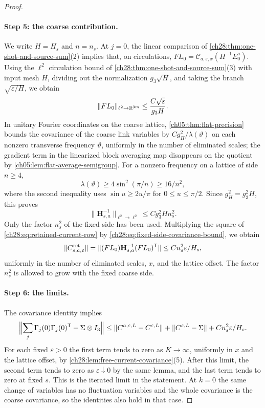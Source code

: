 \begin{proof}
\paragraph{Step 5: the coarse contribution.}
We write $H=H_s$ and $n=n_s$. At $j=0$, the linear comparison of \cref{ch28:thm:one-shot-and-source-sum}(2) implies that, on circulations, $FL_0=\mathscr C_{a,\varepsilon,x}(H^{-1}E_0^a)$. Using the $\ell^2$ circulation bound of \cref{ch28:thm:one-shot-and-source-sum}(3) with input mesh $H$, dividing out the normalization $g_3\sqrt H$, and taking the branch $\sqrt{\varepsilon/H}$, we obtain
\begin{equation}\label{ch28:eq:retained-current-row}
 \|FL_0\|_{\ell^2\to\mathbb R^{3m}}\le\frac{C\sqrt\varepsilon}{g_3H}.
\end{equation}
In unitary Fourier coordinates on the coarse lattice, \cref{ch05:thm:flat-precision} bounds the covariance of the coarse link variables by $Cg_H^2/\lambda(\vartheta)$ on each nonzero transverse frequency $\vartheta$, uniformly in the number of eliminated scales; the gradient term in the linearized block averaging map disappears on the quotient by \cref{ch05:lem:flat-average-semigroup}. For a nonzero frequency on a lattice of side $n\ge4$,
\[
 \lambda(\vartheta)\ge4\sin^2(\pi/n)\ge16/n^2,
\]
where the second inequality uses $\sin u\ge2u/\pi$ for $0\le u\le\pi/2$. Since $g_H^2=g_3^2H$, this proves
\begin{equation}\label{ch28:eq:fixed-side-covariance-bound}
 \|\mathbf H_{s,a}^{-1}\|_{\ell^2\to\ell^2}\le Cg_3^2Hn_s^2.
\end{equation}
Only the factor $n_s^2$ of the fixed side has been used. Multiplying the square of \eqref{ch28:eq:retained-current-row} by \eqref{ch28:eq:fixed-side-covariance-bound}, we obtain
\[
 \|C^{\rm ret}_{s,a,\varepsilon}\|=\|(FL_0)\mathbf H_{s,a}^{-1}(FL_0)^{\mathsf T}\|\le Cn_s^2\varepsilon/H_s,
\]
uniformly in the number of eliminated scales, $x$, and the lattice offset. The factor $n_s^2$ is allowed to grow with the fixed coarse side.

\paragraph{Step 6: the limits.}
The covariance identity implies
\[
 \Bigl\|\sum_j\Gamma_j(0)\Gamma_j(0)^{\mathsf T}-\Sigma\otimes I_3\Bigr\|\le\|C^{a,\varepsilon,L}-C^{\varepsilon,L}\|+\|C^{\varepsilon,L}-\Sigma\|+Cn_s^2\varepsilon/H_s.
\]
For each fixed $\varepsilon>0$ the first term tends to zero as $K\to\infty$, uniformly in $x$ and the lattice offset, by \cref{ch28:lem:free-current-covariance}(5). After this limit, the second term tends to zero as $\varepsilon\downarrow0$ by the same lemma, and the last term tends to zero at fixed $s$. This is the iterated limit in the statement. At $k=0$ the same change of variables has no fluctuation variables and the whole covariance is the coarse covariance, so the identities also hold in that case.
\end{proof}

